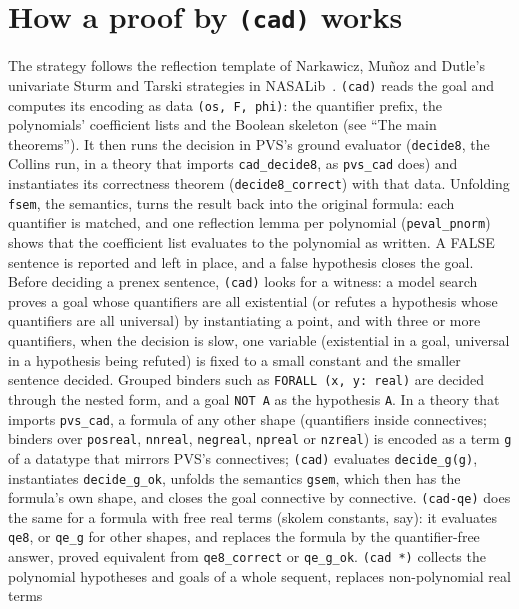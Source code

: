 \documentclass[11pt]{article}
\begin{document}
\section{How a proof by \texttt{(cad)} works}
The strategy follows the reflection template of Narkawicz, Muñoz and Dutle's univariate Sturm and Tarski strategies in
NASALib~\cite{nasalib,nmd}. \texttt{(cad)} reads the goal and computes its encoding as data \texttt{(os, F, phi)}: the
quantifier prefix, the polynomials' coefficient lists and the Boolean skeleton (see ``The main theorems''). It then runs
the decision in PVS's ground evaluator (\texttt{decide8}, the Collins run, in a theory that imports
\texttt{cad\_decide8}, as \texttt{pvs\_cad} does) and
instantiates its correctness theorem (\texttt{decide8\_correct}) with that data. Unfolding
\texttt{fsem}, the semantics, turns the result back into the original formula: each quantifier is matched, and one
reflection lemma per polynomial (\texttt{peval\_pnorm}) shows that the coefficient list evaluates to the polynomial as
written. A FALSE sentence is reported and left in place, and a false hypothesis closes the goal. Before deciding a
prenex sentence, \texttt{(cad)} looks for a witness: a model search proves a goal whose quantifiers are all existential
(or refutes a hypothesis whose quantifiers are all universal) by instantiating a point, and with three or more
quantifiers, when the decision is slow, one variable (existential in a goal, universal in a hypothesis being refuted)
is fixed to a small constant and the smaller sentence decided. Grouped binders such as \texttt{FORALL (x, y: real)} are decided through the nested form, and a goal
\texttt{NOT A} as the hypothesis \texttt{A}. In a theory that imports \texttt{pvs\_cad}, a formula of any other shape
(quantifiers inside connectives; binders over \texttt{posreal}, \texttt{nnreal}, \texttt{negreal}, \texttt{npreal} or
\texttt{nzreal}) is encoded as a term \texttt{g} of a datatype that mirrors PVS's connectives; \texttt{(cad)} evaluates \texttt{decide\_g(g)}, instantiates \texttt{decide\_g\_ok}, unfolds the semantics
\texttt{gsem}, which then has the formula's own shape, and closes the goal connective by connective. \texttt{(cad-qe)}
does the same for a formula with free real terms (skolem constants, say): it evaluates \texttt{qe8}, or \texttt{qe\_g} for other shapes, and replaces the formula by the
quantifier-free answer, proved equivalent from \texttt{qe8\_correct} or \texttt{qe\_g\_ok}.
\texttt{(cad *)} collects the polynomial hypotheses and goals of a whole sequent, replaces non-polynomial real terms
\end{document}

